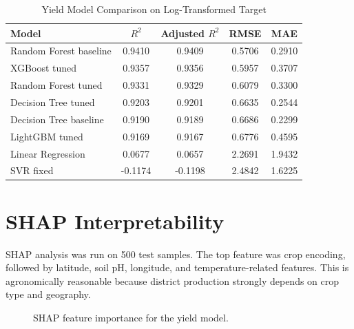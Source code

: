 \documentclass[12pt,a4paper]{report}
\begin{document}
\begin{table}[H]
\centering
\caption{Yield Model Comparison on Log-Transformed Target}
\label{tab:yield_models}
\begin{tabular}{lcccc}
\toprule
\textbf{Model} & \textbf{$R^2$} & \textbf{Adjusted $R^2$} & \textbf{RMSE} & \textbf{MAE} \\
\midrule
Random Forest baseline & 0.9410 & 0.9409 & 0.5706 & 0.2910 \\
XGBoost tuned & 0.9357 & 0.9356 & 0.5957 & 0.3707 \\
Random Forest tuned & 0.9331 & 0.9329 & 0.6079 & 0.3300 \\
Decision Tree tuned & 0.9203 & 0.9201 & 0.6635 & 0.2544 \\
Decision Tree baseline & 0.9190 & 0.9189 & 0.6686 & 0.2299 \\
LightGBM tuned & 0.9169 & 0.9167 & 0.6776 & 0.4595 \\
Linear Regression & 0.0677 & 0.0657 & 2.2691 & 1.9432 \\
SVR fixed & -0.1174 & -0.1198 & 2.4842 & 1.6225 \\
\bottomrule
\end{tabular}
\end{table}

\section{SHAP Interpretability}

SHAP analysis was run on 500 test samples. The top feature was crop encoding, followed by latitude, soil pH, longitude, and temperature-related features. This is agronomically reasonable because district production strongly depends on crop type and geography.

\begin{figure}[H]
\centering
{}
\caption{SHAP feature importance for the yield model.}
\label{fig:shap}
\end{figure}
\end{document}
